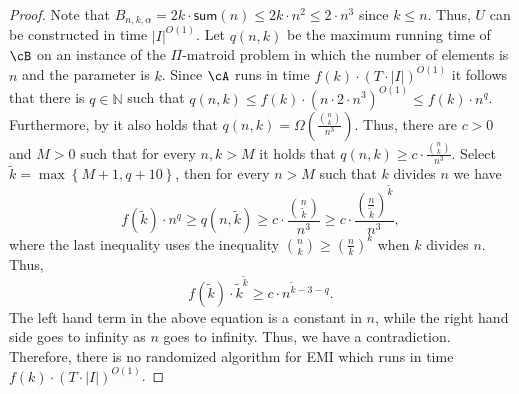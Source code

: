 \begin{proof}
	
	Note that $B_{n,k,\alpha} = 2k \cdot \textsf{sum}(n) \leq 2k \cdot n^2 \leq 2 \cdot n^3$ since $k \leq n$. 
	Thus, $U$ can be constructed in time $|I|^{O(1)}$. 
	Let $q(n,k)$ be the maximum running time of $\cB$ on an instance of the $\Pi$-matroid problem in which the number of elements is $n$ and  the parameter is $k$. Since $\cA$ runs in time $f(k)\cdot (T\cdot |I|)^{O(1)}$ it follows that there is $q\in \mathbb{N}$ such that 
	 $q(n,k)\leq f(k)\cdot (n\cdot 2\cdot n^3)^{O(1)} \leq f(k)\cdot n^{q}$.
	  Furthermore, by   it also holds that $q(n,k) =\Omega\left( \frac{ {n \choose k }}{n^3}\right) $. 
	  Thus, there are $c>0$ and $M>0$ such that for every $n,k>M$ it holds that $q(n,k) \geq c\cdot \frac{ {n \choose k }}{n^3}$. 
	  Select $\tilde{k}=\max\left\{ M+1, q+10\right\}$, then for every $n>M$ such that $k$ divides $n$ we have
	 $$
	 f(\tilde{k})\cdot n^{q} \geq q(n,\tilde{k})\geq  c\cdot \frac{ {n \choose \tilde{k}}}{n^3} \geq c\cdot \frac{\left(\frac{n}{\tilde{k}}\right)^{\tilde{k}}}{n^3 } ,
	 $$
	 where the last inequality uses the inequality ${ n\choose k } \geq \left(\frac{n}{k} \right)^k$ when $k$ divides $n$.
	 Thus,
	 $$
	 f(\tilde{k})\cdot \tilde{k}^{\tilde{k}} \geq   c\cdot n^{\tilde{k}-3-q}.
	 $$
	 The left hand term in the above equation is a constant  in $n$, while the right hand side goes to infinity as $n$ goes to infinity. Thus, we have a contradiction. Therefore, there is no randomized algorithm for EMI which runs in time $f(k)\cdot (T\cdot |I|)^{O(1)}$.
	
	
 
\end{proof}


